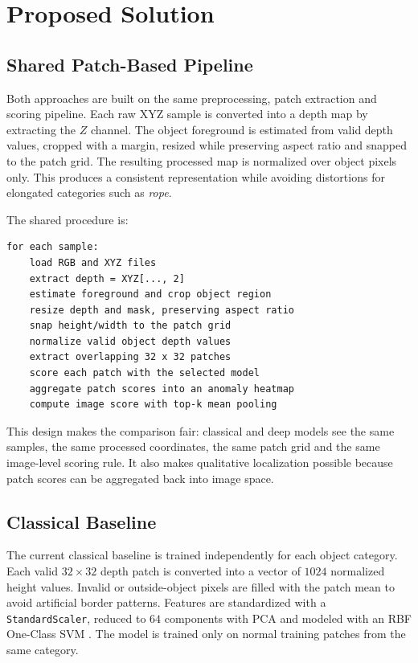 \section{Proposed Solution}

\subsection*{Shared Patch-Based Pipeline}
Both approaches are built on the same preprocessing, patch extraction and scoring pipeline. Each raw XYZ sample is converted into a depth map by extracting the $Z$ channel. The object foreground is estimated from valid depth values, cropped with a margin, resized while preserving aspect ratio and snapped to the patch grid. The resulting processed map is normalized over object pixels only. This produces a consistent representation while avoiding distortions for elongated categories such as \textit{rope}.

The shared procedure is:
\begin{lstlisting}[basicstyle=\ttfamily\scriptsize,frame=single]
for each sample:
    load RGB and XYZ files
    extract depth = XYZ[..., 2]
    estimate foreground and crop object region
    resize depth and mask, preserving aspect ratio
    snap height/width to the patch grid
    normalize valid object depth values
    extract overlapping 32 x 32 patches
    score each patch with the selected model
    aggregate patch scores into an anomaly heatmap
    compute image score with top-k mean pooling
\end{lstlisting}

This design makes the comparison fair: classical and deep models see the same samples, the same processed coordinates, the same patch grid and the same image-level scoring rule. It also makes qualitative localization possible because patch scores can be aggregated back into image space.

\subsection*{Classical Baseline}
The current classical baseline is trained independently for each object category. Each valid $32 \times 32$ depth patch is converted into a vector of $1024$ normalized height values. Invalid or outside-object pixels are filled with the patch mean to avoid artificial border patterns. Features are standardized with a \texttt{StandardScaler}, reduced to $64$ components with PCA and modeled with an RBF One-Class SVM \cite{scholkopf2001estimating}. The model is trained only on normal training patches from the same category.

